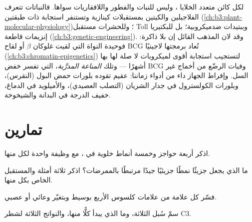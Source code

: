 \begin{remark}\label{rem:b3:innate-immunity:everywhere}
لكل كائن متعدد الخلايا ، وليس للنبات والفطور
واللافقاريات سواها. فالنباتات تتعرف الفلاجيلين والكيتين
بمستقبلات كينازية وتستنفر استجابة ذات طبقتين
(\cref{ch:b3:plant-molecular-physiology})؛ وللحشرات مستقبل
Toll وببتيدات ضدميكروبية؛ بل للبكتيريا إنزيمات قاطعة
 (\cref{ch:b3:genetic-engineering}). وقد لان المذهب
القائل إن  بلا ذاكرة: فوحيدة النواة التي
لقيت غلوكان $\beta$ أو لقاح BCG تُعاد برمجتها لاجينيًا
(\cref{ch:b3:chromatin-epigenetics}) لتستجيب استجابة أقوى
لميكروبات لا صلة لها بها أشهرًا --- وتلك \emph{المناعة
المدرَّبة}، التي تفسر خفض BCG وفيات الرضّع من أخماج غير
السل. وإفراط الجهاز داء من أدواء زماننا:  عقيم تقوده
بلورات حمض البول (النقرس)، وبلورات الكولسترول في جدار
الشريان (التصلب العصيدي)، والأميلويد في الدماغ، 
خفيف الدرجة في البدانة والشيخوخة.
\end{remark}

\section{تمارين}

\begin{exercise}[$\star$]\label{exo:b3:innate-immunity:1}
اذكر أربعة حواجز وخمسة أنماط خلوية في ، مع
وظيفة واحدة لكل منها.
\end{exercise}

\begin{exercise}[$\star$]\label{exo:b3:innate-immunity:2}
ما الذي يجعل جزيئًا نمطًا جزيئيًا جيدًا مرتبطًا بالممرضات؟
اذكر ثلاثة أمثلة والمستقبل الخاص بكل منها.
\end{exercise}

\begin{exercise}[$\star$]\label{exo:b3:innate-immunity:3}
فسّر كل علامة من علامات كلسوس الأربع بوسيط وبتغيّر وعائي أو
عصبي.
\end{exercise}

\begin{exercise}[$\star$]\label{exo:b3:innate-immunity:4}
سمّ سُبل  الثلاثة، وما الذي يبدأ كلًّا منها،
والنواتج الثلاثة لشطر C3.
\end{exercise}

